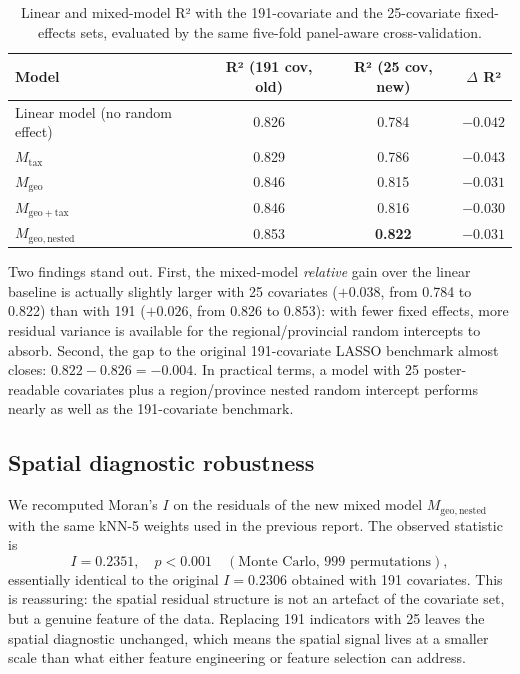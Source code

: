 \documentclass[11pt,a4paper]{article}
\begin{document}
\begin{table}[h!]
  \centering
  \begin{tabular}{lcc c}
    \toprule
    Model & R² (191 cov, old) & R² (25 cov, new) & $\Delta$ R² \\
    \midrule
    Linear model (no random effect)   & 0.826 & 0.784 & $-0.042$ \\
    $M_{\mathrm{tax}}$                 & 0.829 & 0.786 & $-0.043$ \\
    $M_{\mathrm{geo}}$                 & 0.846 & 0.815 & $-0.031$ \\
    $M_{\mathrm{geo+tax}}$             & 0.846 & 0.816 & $-0.030$ \\
    $M_{\mathrm{geo,nested}}$          & 0.853 & \textbf{0.822} & $-0.031$ \\
    \bottomrule
  \end{tabular}
  \caption{Linear and mixed-model R² with the 191-covariate and the
    25-covariate fixed-effects sets, evaluated by the same five-fold
    panel-aware cross-validation.}
  \label{tab:lmm25}
\end{table}

Two findings stand out. First, the mixed-model \emph{relative} gain
over the linear baseline is actually slightly larger with 25
covariates ($+0.038$, from 0.784 to 0.822) than with 191
($+0.026$, from 0.826 to 0.853): with fewer fixed effects, more
residual variance is available for the regional/provincial random
intercepts to absorb. Second, the gap to the original 191-covariate
LASSO benchmark almost closes:
$0.822 - 0.826 = -0.004$. In practical terms, a model with 25
poster-readable covariates plus a region/province nested random
intercept performs nearly as well as the 191-covariate benchmark.

\subsection{Spatial diagnostic robustness}

We recomputed Moran's $I$ on the residuals of the new mixed model
$M_{\mathrm{geo,nested}}$ with the same kNN-5 weights used in the
previous report. The observed statistic is
\begin{equation*}
  I = 0.2351, \quad p < 0.001 \quad (\text{Monte Carlo, 999 permutations}),
\end{equation*}
essentially identical to the original $I = 0.2306$ obtained with 191
covariates. This is reassuring: the spatial residual structure is not
an artefact of the covariate set, but a genuine feature of the data.
Replacing 191 indicators with 25 leaves the spatial diagnostic
unchanged, which means the spatial signal lives at a smaller scale
than what either feature engineering or feature selection can address.
\end{document}
